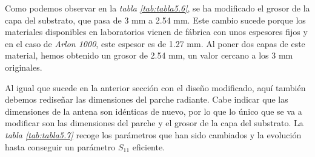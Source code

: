 \begin{table}[h]
    \centering{}
    \caption{Materiales nuevos para la antena de serpentina adaptada del artículo de Soontornpipit.}
    \label{tab:tabla5.6}
\end{table}

Como podemos observar en la \textit{tabla \ref{tab:tabla5.6}}, se ha modificado el grosor de la capa del substrato, que pasa de 3 mm a 2.54 mm. Este cambio sucede porque los materiales disponibles en laboratorios vienen de fábrica con unos espesores fijos y en el caso de \textit{Arlon 1000}, este espesor es de 1.27 mm. Al poner dos capas de este material, hemos obtenido un grosor de 2.54 mm, un valor cercano a los 3 mm originales.

Al igual que sucede en la anterior sección con el diseño modificado, aquí también debemos rediseñar las dimensiones del parche radiante. Cabe indicar que las dimensiones de la antena son idénticas de nuevo, por lo que lo único que se va a modificar son las dimensiones del parche y el grosor de la capa del substrato. La \textit{tabla \ref{tab:tabla5.7}} recoge los parámetros que han sido cambiados y la evolución hasta conseguir un parámetro $S_{11}$ eficiente.

